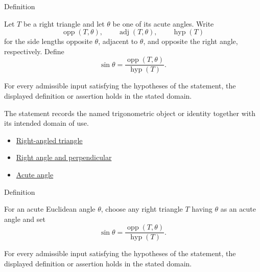 

\begin{definitionbox}{Definition}
\begin{definition}
\label{def:right-triangle-sine}
Let $T$ be a right triangle and let $\theta$ be one of its acute angles. Write
\[
  \operatorname{opp}(T,\theta),\qquad
  \operatorname{adj}(T,\theta),\qquad
  \operatorname{hyp}(T)
\]
for the side lengths opposite $\theta$, adjacent to $\theta$, and opposite the
right angle, respectively. Define
\[
\sin\theta=\frac{\operatorname{opp}(T,\theta)}{\operatorname{hyp}(T)}.
\]
\end{definition}
\end{definitionbox}
\begin{remark*}
For every admissible input satisfying the hypotheses of the statement, the
displayed definition or assertion holds in the stated domain.
\end{remark*}

\begin{remark*}[Interpretation]
The statement records the named trigonometric object or identity together with
its intended domain of use.
\end{remark*}

\begin{dependencies}
\begin{itemize}
  \item \hyperref[def:euclid-triangle-angle-classes]{Right-angled triangle}
  \item \hyperref[def:euclid-right-angle-and-perpendicular]{Right angle and perpendicular}
  \item \hyperref[def:euclid-acute-angle]{Acute angle}
\end{itemize}
\end{dependencies}

\begin{definitionbox}{Definition}
\begin{definition}
\label{def:acute-angle-sine}
For an acute Euclidean angle $\theta$, choose any right triangle $T$ having
$\theta$ as an acute angle and set
\[
  \sin\theta=\frac{\operatorname{opp}(T,\theta)}{\operatorname{hyp}(T)}.
\]
\end{definition}
\end{definitionbox}
\begin{remark*}
For every admissible input satisfying the hypotheses of the statement, the
displayed definition or assertion holds in the stated domain.
\end{remark*}


